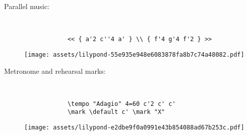 \documentclass[a4paper]{tufte-handout}
\newenvironment{abjadbookoutput}{}{}
\begin{document}
\begin{description}
\begin{multicols}{2}
        \end{multicols}

    \item[Parallel music:]
        \hfill \vspace{-\baselineskip} \\
        \begin{multicols}{2}

            \begin{verbatim}
            << { a'2 c''4 a' } \\ { f'4 g'4 f'2 } >>
            \end{verbatim}

            \begin{comment}
            <lilypond>[stylesheet=stylesheet-minimal.ily]
            << { a'2 c''4 a' } \\ { f'4 g'4 f'2 } >>
            </lilypond>
            \end{comment}

            \begin{abjadbookoutput}
            \noindent\texttt{[image: assets/lilypond-55e935e948e6083878fa8b7c74a48082.pdf]}
            \end{abjadbookoutput}

        \end{multicols}

    \item[Metronome and rehearsal marks:]
        \hfill \vspace{-\baselineskip} \\
        \begin{multicols}{2}

            \begin{verbatim}
            \tempo "Adagio" 4=60 c'2 c' c'
            \mark \default c' \mark "X"
            \end{verbatim}

            \begin{comment}
            <lilypond>
            {
                \tempo "Adagio" 4=60 c'2 c' c'
                \mark \default c' \mark "X"
            }
            </lilypond>
            \end{comment}

            \begin{abjadbookoutput}
            \noindent\texttt{[image: assets/lilypond-e2dbe9f0a0991e43b854088ad67b253c.pdf]}
            \end{abjadbookoutput}


\end{multicols}
\end{description}
\end{document}
